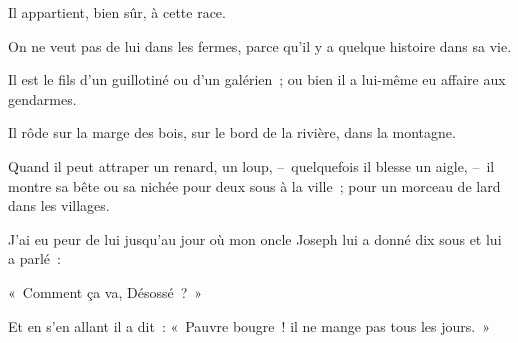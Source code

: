 \documentclass[french,twoside]{book} %
\def\mednobreak{\ifdim\lastskip<\medskipamount
  \removelastskip\nopagebreak\medskip\fi}
\newcommand{\labelblock}[1]{\medbreak{\noindent\color{rubric}\bfseries #1}\par\mednobreak}
\begin{document}
Il appartient, bien sûr, à cette race.\par
On ne veut pas de lui dans les fermes, parce qu’il y a quelque histoire dans sa vie.\par
Il est le fils d’un guillotiné ou d’un galérien ; ou bien il a lui-même eu affaire aux gendarmes.\par
Il rôde sur la marge des bois, sur le bord de la rivière, dans la montagne.\par
Quand il peut attraper un renard, un loup, – quelquefois il blesse un aigle, – il montre sa bête ou sa nichée pour deux sous à la ville ; pour un morceau de lard dans les villages.\par
J’ai eu peur de lui jusqu’au jour où mon oncle Joseph lui a donné dix sous et lui a parlé :\par
« Comment ça va, Désossé ? »\par
Et en s’en allant il a dit : « Pauvre bougre ! il ne mange pas tous les jours. »\par

\labelblock{SUR LE BREUIL}
\end{document}
